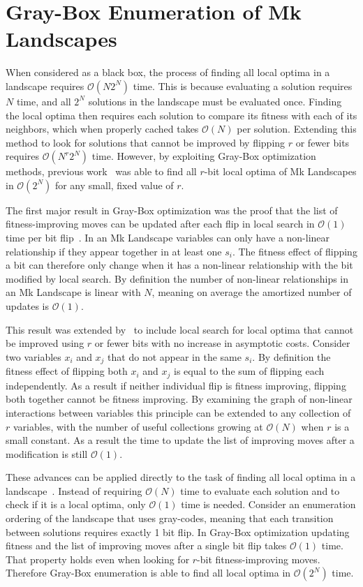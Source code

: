 \documentclass[runningheads,a4paper]{llncs}
\newcommand{\BigO}[1]{$\mathcal{O}{(#1)}$}
\begin{document}
\section{Gray-Box Enumeration of Mk Landscapes}
When considered as a black box, the process of finding all local optima
in a landscape requires \BigO{N2^N} time. This is because evaluating
a solution requires $N$ time, and all $2^N$ solutions in the landscape
must be evaluated once. Finding the local
optima then requires each solution to compare its fitness with each
of its neighbors, which when properly cached takes \BigO{N} per solution.
Extending this method to look for solutions that cannot be improved by
flipping $r$ or fewer bits requires \BigO{N^r2^N} time. However,
by exploiting Gray-Box optimization methods, previous work~\cite{ochoa:2015:crossovernetworks}
was able to find all $r$-bit local optima of Mk Landscapes in \BigO{2^N} for any small,
fixed value of $r$.

The first major result in Gray-Box optimization was the proof that the list
of fitness-improving moves can be updated after each flip in local search in \BigO{1}
time per bit flip~\cite{whitley:2012:constant}. In an Mk Landscape variables
can only have a non-linear relationship if they appear together in at least one $s_i$.
The fitness effect of flipping a bit can therefore only change when it has a non-linear
relationship with the bit modified by local search. By definition the number of non-linear
relationships in an Mk Landscape is linear with $N$, meaning on average the amortized
number of updates is \BigO{1}.

This result was extended by~\cite{chicano:2014:ball} to include local search for local
optima that cannot be improved using $r$ or fewer bits with no increase in asymptotic costs.
Consider two variables $x_i$ and $x_j$ that do not appear in the same $s_i$.
By definition the fitness effect of flipping both $x_i$ and $x_j$ is equal to the sum
of flipping each independently. As a result if neither individual flip is fitness improving,
flipping both together cannot be fitness improving. By examining the graph of non-linear
interactions between variables this principle can be extended to any collection of $r$
variables, with the number of useful collections growing at \BigO{N} when $r$ is a small constant.
As a result the time to update the list of improving moves after a modification is still \BigO{1}.

These advances can be applied directly to the task of finding all local optima in a
landscape~\cite{ochoa:2015:crossovernetworks}.
Instead of requiring \BigO{N} time to evaluate each solution and to check if it
is a local optima, only \BigO{1} time is needed. Consider an enumeration ordering of the landscape
that uses gray-codes, meaning that each transition between solutions requires exactly 1 bit flip.
In Gray-Box optimization updating fitness and the list of improving moves after a single bit flip
takes \BigO{1} time. That property holds even when looking for $r$-bit fitness-improving moves.
Therefore Gray-Box enumeration is able to find all local optima in \BigO{2^N} time.
\end{document}
